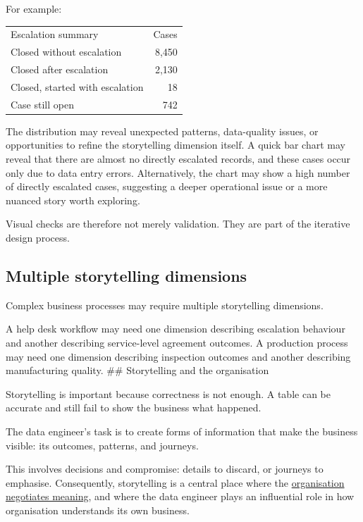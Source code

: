 \documentclass[10pt,openany,10pt]{book}
\newcounter{none}
\let\podeToprule\toprule
\let\podeMidrule\midrule
\let\podeBottomrule\bottomrule
\renewcommand{\toprule}{\arrayrulecolor{pbiGrid}\podeToprule}
\renewcommand{\midrule}{\arrayrulecolor{pbiGrid}\podeMidrule}
\renewcommand{\bottomrule}{\arrayrulecolor{pbiGrid}\podeBottomrule}
\begin{document}
For example:

{\def\LTcaptype{none} %
\begin{longtable}[]{@{}lr@{}}
\toprule\noalign{}
Escalation summary & Cases \\
\midrule\noalign{}
\endhead
\bottomrule\noalign{}
\endlastfoot
Closed without escalation & 8,450 \\
Closed after escalation & 2,130 \\
Closed, started with escalation & 18 \\
Case still open & 742 \\
\end{longtable}
}

The distribution may reveal unexpected patterns, data-quality issues, or
opportunities to refine the storytelling dimension itself. A quick bar
chart may reveal that there are almost no directly escalated records,
and these cases occur only due to data entry errors. Alternatively, the
chart may show a high number of directly escalated cases, suggesting a
deeper operational issue or a more nuanced story worth exploring.

Visual checks are therefore not merely validation. They are part of the
iterative design process.

\subsection{Multiple storytelling
dimensions}\label{multiple-storytelling-dimensions}

Complex business processes may require multiple storytelling dimensions.

A help desk workflow may need one dimension describing escalation
behaviour and another describing service-level agreement outcomes. A
production process may need one dimension describing inspection outcomes
and another describing manufacturing quality. \#\# Storytelling and the
organisation

Storytelling is important because correctness is not enough. A table can
be accurate and still fail to show the business what happened.

The data engineer's task is to create forms of information that make the
business visible: its outcomes, patterns, and journeys.

This involves decisions and compromise: details to discard, or journeys
to emphasise. Consequently, storytelling is a central place where the
\hyperref[docs-foundations-data-and-organisations]{organisation
negotiates meaning}, and where the data engineer plays an influential
role in how organisation understands its own business.
\end{document}
